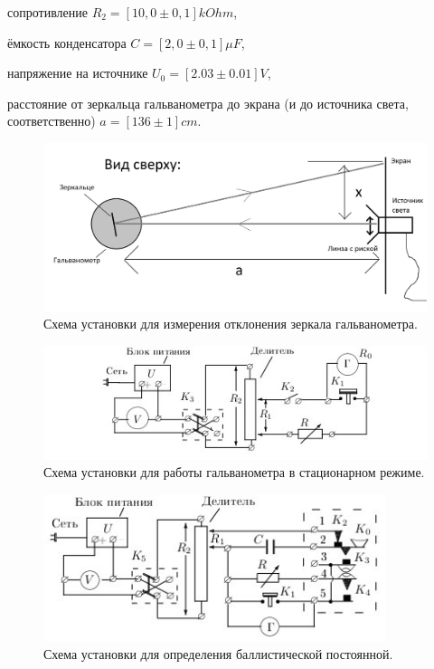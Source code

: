 \documentclass[a4paper,12pt]{article}
\begin{document}
сопротивление $R_2 = [10,0 \pm 0,1]kOhm $,

ёмкость конденсатора $C = [2,0 \pm 0,1]\mu F $,

напряжение на источнике $U_0 = [2.03 \pm 0.01]V$,

расстояние от зеркальца гальванометра до экрана (и до источника света, соответственно) $a = [136 \pm 1] cm$.

   
   \begin{figure}[h!]
   \centering
   \includegraphics[width=14cm]{fig3.jpg} 
   \caption{Схема установки для измерения отклонения зеркала гальванометра.} 
   \label{fig.3} 
   \end{figure}   
   
   \begin{figure}[h!]
   \centering
   \includegraphics[width=12cm]{fig1.jpg} 
   \caption{Схема установки для работы гальванометра в стационарном режиме.} 
   \label{fig.1} 
   \end{figure}

   \begin{figure}[h]
   \centering
   \includegraphics[width=10cm]{fig2.jpg} 
   \caption{Схема установки для определения баллистической постоянной.} 
   \label{fig.2} 
   \end{figure}
\end{document}
